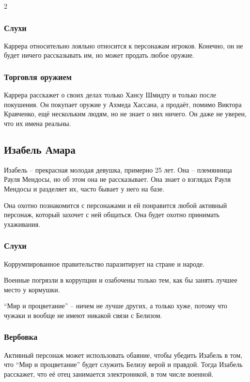 \documentclass[twoside]{article}
\begin{document}
\begin{multicols}{2}
\subsubsection{Слухи}\label{rumors-carrera}

Каррера относительно лояльно относится к персонажам игроков. Конечно, он
не будет ничего рассказывать им, но может продать любое оружие.

\subsubsection{Торговля оружием}\label{arms-trading}

Каррера расскажет о своих делах только Хансу Шмидту и только после
покушения. Он покупает оружие у Ахмеда Хассана, а продаёт, помимо
Виктора Кравченко, ещё нескольким людям, но не знает о них ничего. Он
даже не уверен, что их имена реальны.

\subsection{Изабель Амара}\label{isabel-amara}

Изабель -- прекрасная молодая девушка, примерно 25 лет. Она --
племянница Рауля Мендосы, но об этом она не рассказывает. Она знает о
взглядах Рауля Мендосы и разделяет их, часто бывает у него на базе.

Она охотно познакомится с персонажами и ей понравится любой активный
персонаж, который захочет с ней общаться. Она будет охотно принимать
ухаживания.

\subsubsection{Слухи}\label{rumors-isabel}

Коррумпированное правительство паразитирует на стране и народе.

Военные погрязли в коррупции и озабочены только тем, как бы занять
лучшее место у кормушки.

\enquote{Мир и процветание} -- ничем не лучше других, а только хуже, потому что
чужаки и вообще не имеют никакой связи с Белизом.

\subsubsection{Вербовка}\label{recruitment-isabel}

Активный персонаж может использовать обаяние, чтобы убедить Изабель в
том, что \enquote{Мир и процветание} будет служить Белизу верой и правдой. Тогда
Изабель расскажет, что её отец занимается электроникой, в том числе
военной.


\end{multicols}
\end{document}

